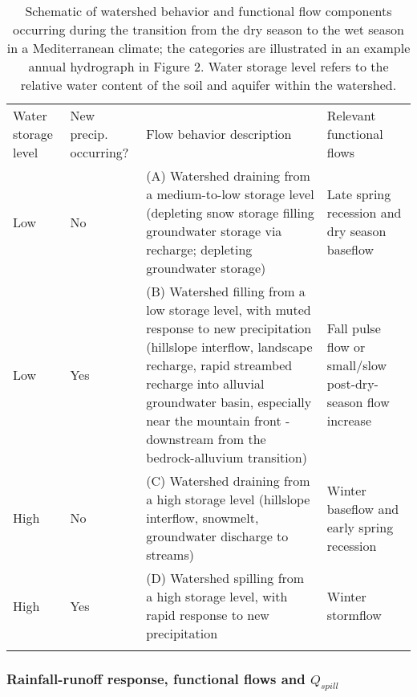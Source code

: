 \documentclass[hess, manuscript]{copernicus}
\begin{document}
\begin{table*}[t]
\caption{Schematic of watershed behavior and functional flow components occurring during the transition from the dry season to the wet season in a Mediterranean climate; the categories are illustrated in an example annual hydrograph in Figure 2. Water storage level refers to the relative water content of the soil and aquifer within the watershed.}
\label{tab:watershed_modes_tab}
\begin{tabular}{p{1.8cm} p{1.6cm} p{6.0cm} p{3.8cm}}
\tophline
Water storage level & New precip. occurring? & Flow behavior description & Relevant functional flows \\
\middlehline
 Low & No & (A) Watershed draining from a medium-to-low storage level (depleting snow storage filling groundwater storage via recharge; depleting groundwater storage) & Late spring recession and dry season baseflow \\ 
 \middlehline
Low & Yes & (B) Watershed filling from a low storage level, with muted response to new precipitation (hillslope interflow, landscape recharge, rapid streambed recharge into alluvial groundwater basin, especially near the mountain front - downstream from the bedrock-alluvium transition) & Fall pulse flow or small/slow post-dry-season flow increase \\
\middlehline
High & No & (C) Watershed draining from a high storage level (hillslope interflow, snowmelt, groundwater discharge to streams) & Winter baseflow and early spring recession \\
\middlehline
High & Yes & (D) Watershed spilling from a high storage level, with rapid response to new precipitation & Winter stormflow\\
\bottomhline
\end{tabular}
\belowtable{}
\end{table*}

\subsubsection{\texorpdfstring{Rainfall-runoff response, functional
flows and
$Q_{spill}$}{Rainfall-runoff response, functional flows and Q\_\{spill\}}}
\end{document}

